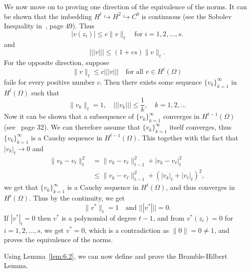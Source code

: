 \begin{bev}
We now move on to proving one direction of the equivalence of the norms. 
It can be shown that the imbedding $H^t\hookrightarrow H^2 \hookrightarrow C^0$ is continuous 
(see the Sobolev Inequality in~\cite{Braess}, page 49). Thus
\begin{equation*}
    |v(z_i)|\leq c\|v\|_t\quad \text{for } i=1,2,\ldots,s.
\end{equation*} 
and
\begin{equation*}
    |||v|||\leq (1+cs)\|v\|_t.
\end{equation*}
For the opposite direction, suppose 
\begin{equation*}
    \|v\|_t\leq c|||v|||\quad \text{for all } v\in H^t(\Omega)
\end{equation*}
fails for every positive number $c$. Then there exists some sequence $\{v_k\}_{k=1}^\infty$ in $H^t(\Omega)$ such that
\begin{equation*}
    \|v_k\|_t=1,\quad |||v_k|||\leq \frac{1}{k},\quad k=1,2,\ldots
\end{equation*}
Now it can be shown that a subsequence of $\{v_k\}_{k=1}^\infty$ converges in $H^{t-1}(\Omega)$ (see~\cite{Braess} page 32). We can therefore assume that $\{v_k\}_{k=1}^\infty$ itself converges, thus $\{v_k\}_{k=1}^\infty$ is a Cauchy sequence in $H^{t-1}(\Omega)$.
This together with the fact that $|v_k|_t\to 0$ and
\begin{align*}
    \|v_k-v_\ell\|_t^2 &= \|v_k-v_\ell\|_{t-1}^2 + |v_k-v_\ell|_t^2 \\
    & \leq\|v_k-v_\ell\|_{t-1}^2 + {(|v_k|_t + |v_\ell|_t)}^2 ,
\end{align*}
 we get that $\{v_k\}_{k=1}^\infty$ is a Cauchy sequence in $H^t(\Omega)$, and thus converges in $H^t(\Omega)$.
Thus by the continuity, we get 
\begin{equation}
    \|v^*\|_t = 1\quad \text{and }|||v^*|||=0. 
\end{equation}
If $|v^*|_t = 0$ then $v^*$ is a polynomial of degree $t-1$, and from $v^*(z_i)=0$ for $i=1,2,\ldots,s$, we get $v^*=0$,
which is a contradiction as $\|0\|=0\neq 1$, and proves the equivalence of the norms.
\end{bev}

Using Lemma~\ref{lem:6.2}, we can now define and prove the Bramble-Hilbert Lemma.

